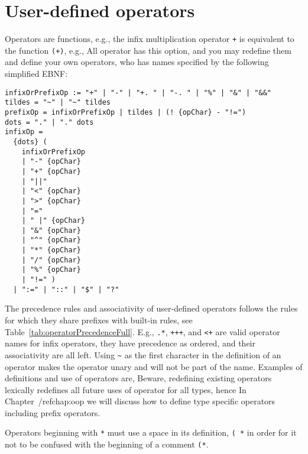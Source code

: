\section{User-defined operators}
\label{sec:functions}
Operators are functions, e.g., the infix multiplication operator \lstinline!+! is equivalent to the function \lstinline!(+)!, e.g.,
%
%
All operator has this option, and you may redefine them and define your own operators, who has names specified by the following simplified EBNF:
\begin{lstlisting}[language=ebnf, caption={Grammar for infix and prefix tokens},label=list:infixOrPrefixOperators]
infixOrPrefixOp := "+" | "-" | "+. " | "-. " | "%" | "&" | "&&"
tildes = "~" | "~" tildes
prefixOp = infixOrPrefixOp | tildes | (! {opChar} - "!=")
dots = "." | "." dots
infixOp = 
  {dots} (
    infixOrPrefixOp  
    | "-" {opChar} 
    | "+" {opChar} 
    | "||" 
    | "<" {opChar} 
    | ">" {opChar} 
    | "="  
    | " |" {opChar} 
    | "&" {opChar} 
    | "^" {opChar} 
    | "*" {opChar} 
    | "/" {opChar} 
    | "%" {opChar} 
    | "!=" )
  | ":=" | "::" | "$" | "?"
\end{lstlisting}
The precedence rules and associativity of user-defined operators follows the rules for which they share prefixes with built-in rules, see Table~\ref{tab:operatorPrecedenceFull}. E.g., \lstinline!.*!, \lstinline!+++!, and \lstinline!<+! are valid operator names for infix operators, they have precedence as ordered, and their associativity are all left. Using \lstinline!~! as the first character in the definition of an operator makes the operator unary and will not be part of the name. Examples of definitions and use of operators are,
%
%
Beware, redefining existing operators lexically redefines all future uses of operator for all types, hence  In Chapter~/ref{chap:oop} we will discuss how to define type specific operators including prefix operators. 

Operators beginning with \lstinline!*! must use a space in its definition, \lstinline!( *! in order for it not to be confused with the beginning of a comment \lstinline!(*!. 

